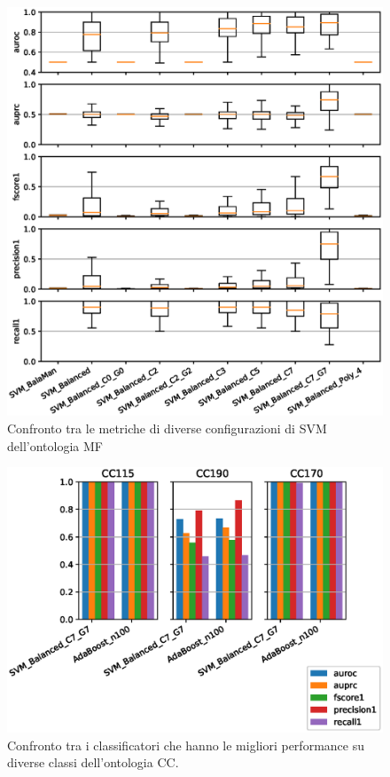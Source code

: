 \documentclass[12pt,a4paper,oneside,hidelinks]{report}
\begin{document}
\begin{figure}[hb]%
    \centering
    \includegraphics[scale = 0.80]{MF-SVM-level1.eps}%
    \caption{Confronto tra le metriche di diverse configurazioni di SVM dell'ontologia MF}%
    \label{figure:liv1.4}%
\end{figure}

\vspace*{\fill}




\vspace*{\fill}

\begin{figure}[ht]%
    \centering
    \includegraphics[scale = 0.80]{CC-level2.eps}%
    \caption{Confronto tra i classificatori che hanno le migliori performance su diverse classi dell'ontologia CC.}%
    \label{fig:liv2}%
\end{figure}
\end{document}
